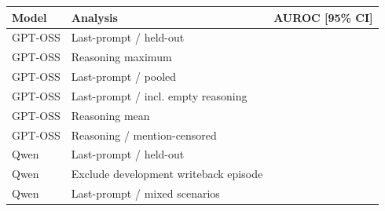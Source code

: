 \begin{tabular}{llc}
\toprule
Model & Analysis & AUROC [95\% CI] \\
\midrule
GPT-OSS & Last-prompt / held-out & \gptossCallProbe{} \gptossCallProbeCI{} \\
GPT-OSS & Reasoning maximum & \gptossCallReasoning{} \gptossCallReasoningCI{} \\
GPT-OSS & Last-prompt / pooled & \gptossRobustPooled{} \gptossRobustPooledCI{} \\
GPT-OSS & Last-prompt / incl. empty reasoning & \gptossRobustAllReplies{} \gptossRobustAllRepliesCI{} \\
GPT-OSS & Reasoning mean & \gptossReasoningMean{} \gptossReasoningMeanCI{} \\
GPT-OSS & Reasoning / mention-censored & \gptossReasoningCensored{} \gptossReasoningCensoredCI{} \\
Qwen & Last-prompt / held-out & \qwenCallProbe{} \qwenCallProbeCI{} \\
Qwen & Exclude development writeback episode & \qwenNoSourceWriteback{} \qwenNoSourceWritebackCI{} \\
Qwen & Last-prompt / mixed scenarios & \qwenPerCallMixedScenario{} \qwenPerCallMixedScenarioCI{} \\
\bottomrule
\end{tabular}
